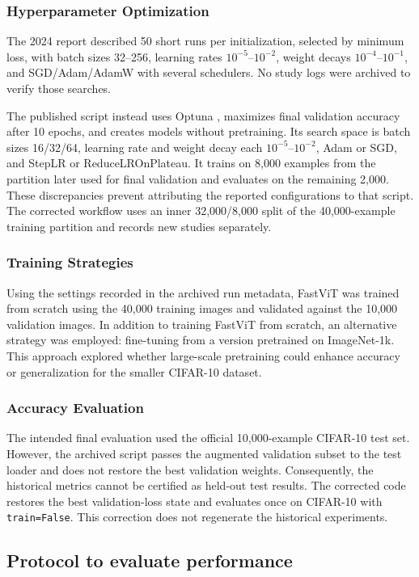 \documentclass[12pt]{article}
\begin{document}
\subsubsection{Hyperparameter Optimization}
The 2024 report described 50 short runs per initialization, selected by minimum loss, with batch sizes 32--256, learning rates $10^{-5}$--$10^{-2}$, weight decays $10^{-4}$--$10^{-1}$, and SGD/Adam/AdamW with several schedulers. No study logs were archived to verify those searches.

The published script instead uses Optuna \cite{optuna}, maximizes final validation accuracy after 10 epochs, and creates models without pretraining. Its search space is batch sizes 16/32/64, learning rate and weight decay each $10^{-5}$--$10^{-2}$, Adam or SGD, and StepLR or ReduceLROnPlateau. It trains on 8,000 examples from the partition later used for final validation and evaluates on the remaining 2,000. These discrepancies prevent attributing the reported configurations to that script. The corrected workflow uses an inner 32,000/8,000 split of the 40,000-example training partition and records new studies separately.

\subsubsection{Training Strategies}
Using the settings recorded in the archived run metadata, FastViT was trained from scratch using the 40,000 training images and validated against the 10,000 validation images. In addition to training FastViT from scratch, an alternative strategy was employed: fine-tuning from a version pretrained on ImageNet-1k. This approach explored whether large-scale pretraining could enhance accuracy or generalization for the smaller CIFAR-10 dataset.

\subsubsection{Accuracy Evaluation}
The intended final evaluation used the official 10,000-example CIFAR-10 test set. However, the archived script passes the augmented validation subset to the test loader and does not restore the best validation weights. Consequently, the historical metrics cannot be certified as held-out test results. The corrected code restores the best validation-loss state and evaluates once on CIFAR-10 with \texttt{train=False}. This correction does not regenerate the historical experiments.

\subsection{Protocol to evaluate performance}
\end{document}

